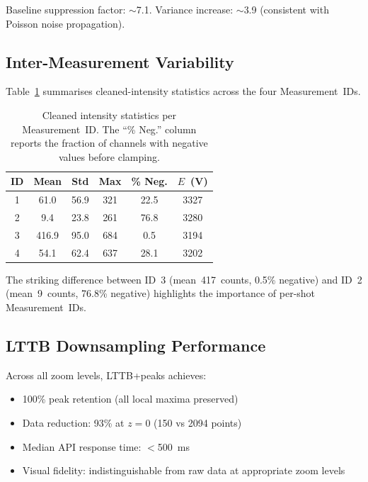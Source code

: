 \documentclass[a4paper,twocolumn,10pt]{article}
\begin{document}
Baseline suppression factor: $\sim$7.1.
Variance increase: $\sim$3.9 (consistent with Poisson noise propagation).

\subsection{Inter-Measurement Variability}

Table~\ref{tab:measurement_stats} summarises cleaned-intensity
statistics across the four Measurement~IDs.

\begin{table}[htbp]
\centering
\caption{Cleaned intensity statistics per Measurement~ID.  The
  ``\% Neg.'' column reports the fraction of channels with negative
  values before clamping.}
\label{tab:measurement_stats}
{\small
\begin{tabular}{@{}cccccc@{}}
\toprule
\textbf{ID} & \textbf{Mean} & \textbf{Std} & \textbf{Max} & \textbf{\% Neg.} & \textbf{$E$~(V)} \\
\midrule
1 & 61.0  & 56.9  & 321  & 22.5 & 3327 \\
2 & 9.4   & 23.8  & 261  & 76.8 & 3280 \\
3 & 416.9 & 95.0  & 684  & 0.5  & 3194 \\
4 & 54.1  & 62.4  & 637  & 28.1 & 3202 \\
\bottomrule
\end{tabular}
}
\end{table}

The striking difference between ID~3 (mean~417~counts, 0.5\% negative)
and ID~2 (mean~9~counts, 76.8\% negative) highlights the importance
of per-shot Measurement~IDs.

\subsection{LTTB Downsampling Performance}

Across all zoom levels, LTTB+peaks achieves:

\begin{itemize}[nosep,leftmargin=*]
  \item 100\% peak retention (all local maxima preserved)
  \item Data reduction: 93\% at $z=0$ (150 vs 2094 points)
  \item Median API response time: $<$\SI{500}{\milli\second}
  \item Visual fidelity: indistinguishable from raw data at
    appropriate zoom levels
\end{itemize}
\end{document}
